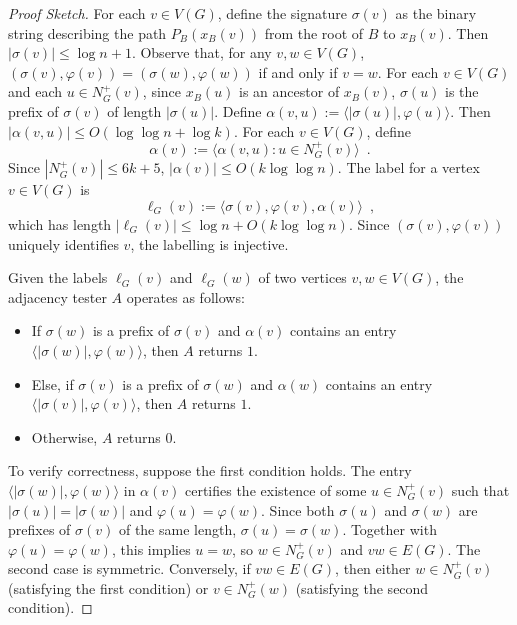 \documentclass{patmorin}
\renewcommand{\le}{\leqslant}
\newcommand{\Oh}{O}
\begin{document}
\begin{proof}[Proof Sketch]
  For each $v\in V(G)$, define the signature $\sigma(v)$ as the binary string describing the path $P_B(x_B(v))$ from the root of $B$ to $x_B(v)$. Then $|\sigma(v)|\le \log n + 1$. Observe that, for any $v,w\in V(G)$, $(\sigma(v),\varphi(v)) = (\sigma(w),\varphi(w))$ if and only if $v=w$.
  For each $v\in V(G)$ and each $u\in N^+_G(v)$, since $x_B(u)$ is an ancestor of $x_B(v)$, $\sigma(u)$ is the prefix of $\sigma(v)$ of length $|\sigma(u)|$. Define $\alpha(v,u):=\langle |\sigma(u)|,\varphi(u)\rangle$. Then $|\alpha(v,u)|\le \Oh(\log\log n + \log k)$. For each $v\in V(G)$, define
  \[
    \alpha(v):=\langle \alpha(v,u):u\in N^+_G(v)\rangle \enspace .
  \]
  Since $|N^+_G(v)|\le 6k+5$, $|\alpha(v)|\le \Oh(k\log\log n)$. The label for a vertex $v\in V(G)$ is
  \[
    \ell_G(v) := \langle \sigma(v),\varphi(v),\alpha(v)\rangle \enspace ,
  \]
  which has length $|\ell_G(v)| \le \log n + \Oh(k\log\log n)$. Since $(\sigma(v),\varphi(v))$ uniquely identifies $v$, the labelling is injective.

  Given the labels $\ell_G(v)$ and $\ell_G(w)$ of two vertices $v,w\in V(G)$, the adjacency tester $A$ operates as follows:
  \begin{itemize}[nosep,nolistsep]
    \item If $\sigma(w)$ is a prefix of $\sigma(v)$ and $\alpha(v)$ contains an entry $\langle|\sigma(w)|,\varphi(w)\rangle$, then $A$ returns $1$.
    \item Else, if $\sigma(v)$ is a prefix of $\sigma(w)$ and $\alpha(w)$ contains an entry $\langle|\sigma(v)|,\varphi(v)\rangle$, then $A$ returns $1$.
    \item Otherwise, $A$ returns $0$.
  \end{itemize}
  To verify correctness, suppose the first condition holds. The entry $\langle|\sigma(w)|,\varphi(w)\rangle$ in $\alpha(v)$ certifies the existence of some $u\in N^+_G(v)$ such that $|\sigma(u)|=|\sigma(w)|$ and $\varphi(u)=\varphi(w)$. Since both $\sigma(u)$ and $\sigma(w)$ are prefixes of $\sigma(v)$ of the same length, $\sigma(u)=\sigma(w)$. Together with $\varphi(u)=\varphi(w)$, this implies $u=w$, so $w\in N^+_G(v)$ and $vw\in E(G)$. The second case is symmetric. Conversely, if $vw\in E(G)$, then either $w\in N^+_G(v)$ (satisfying the first condition) or $v\in N^+_G(w)$ (satisfying the second condition).


\end{proof}
\end{document}
